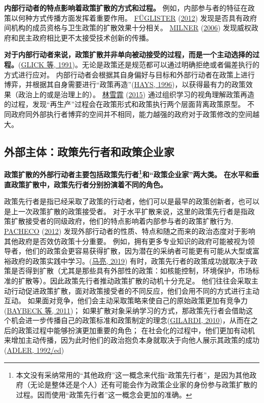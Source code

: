 \documentclass[
  12pt,
]{ctexart}
\begin{document}
\textbf{内部行动者的特点影响着政策扩散的方式和过程。}
例如，内部参与者的特征在政策以何种方式传播方面发挥着重要作用。
\protect\hyperlink{ref-Fuglister2012}{FÜGLISTER} (\protect\hyperlink{ref-Fuglister2012}{2012}) 发现是否具有政府间机构的成员资格与卫生政策的扩散效果十分相关。
\protect\hyperlink{ref-Milner2006}{MILNER} (\protect\hyperlink{ref-Milner2006}{2006}) 发现威权政府和民主政府相比更不太接受技术创新的传播。

\textbf{对于内部行动者来说，政策扩散并非单向被动接受的过程，而是一个主动选择的过程。}(\protect\hyperlink{ref-GlickHays1991}{GLICK 等, 1991})。无论是政策还是规范都可以通过明确拒绝或者偏差执行的方式进行应对。
内部行动者会根据其自身偏好与目标和外部行动者在政策上进行博弈，并根据其自身需要进行``政策再造''(\protect\hyperlink{ref-Hays1996}{HAYS, 1996})，以获得最有力的政策效果（政治上的或是治理上的）。
\protect\hyperlink{ref-LinXueFei2015}{林雪霏} (\protect\hyperlink{ref-LinXueFei2015}{2015}) 通过组织学习的视角理解政策再造的过程，发现``再生产''过程会在政策形式和政策执行两个层面背离政策原型。
不同政府同外部执行者博弈的空间并不相同，能力越强的政府对于政策修改的空间越大。

\hypertarget{ux5916ux90e8ux4e3bux4f53ux653fux7b56ux5148ux884cux8005ux548cux653fux7b56ux4f01ux4e1aux5bb6}{%
\subsection{外部主体：政策先行者和政策企业家}\label{ux5916ux90e8ux4e3bux4f53ux653fux7b56ux5148ux884cux8005ux548cux653fux7b56ux4f01ux4e1aux5bb6}}

\textbf{政策扩散的外部行动者主要包括政策先行者\footnote{本文没有采纳常用的``其他政府''这一概念来代指``政策先行者''，是因为其他政府（无论是整体还是个人）还有可能会作为政策企业家的身份参与政策扩散的过程。因而使用``政策先行者''这一概念会更加的准确。}和``政策企业家''两大类。}
\textbf{在水平和垂直政策扩散中，政策先行者分别扮演着不同的角色。}

政策先行者是指已经采取了政策的行动者，他们可以是最早的政策创新者，也可以是上一次政策扩散的政策接受者。
对于水平扩散来说，这里的政策先行者是指政策扩散接受者的同级政府，他们的特点影响着内部参与者的政策扩散行为,
\protect\hyperlink{ref-Pacheco2012a}{PACHECO} (\protect\hyperlink{ref-Pacheco2012a}{2012}) 发现外部行动者的性质、特点和随之而来的政治态度对于影响其他政府是否效仿政策十分重要。
例如，拥有更多专业知识的政府可能被视为领导者，他们的政策会更容易获得扩散，因为潜在的采纳者可能更有可能从大型或富裕政府的政策实践中学习。(\protect\hyperlink{ref-MaLiang2019}{马亮, 2019})
有时，政策先行者的政策成功就取决于政策是否得到扩散（尤其是那些具有外部性的政策：如核能控制，环境保护，市场标准的扩散等）。因此政策先行者推动政策扩散的动机十分充足。
他们往往会采取主动行动促进政策扩散，面对政策接受者的不同反应，他们会用不同的方式进行主动互动。
如果面对竞争，他们会主动采取策略来使自己的原始政策更加有竞争力(\protect\hyperlink{ref-BaybeckEtAl2011}{BAYBECK 等, 2011})；
如果扩散对象采纳学习的方式，那政策先行者会借助这个机会进一步传播自己的政策标准和政策制定的理念(\protect\hyperlink{ref-Gilardi2010b}{GILARDI, 2010})，从而在之后的政策过程中能够扮演更加重要的角色；
在社会化的过程中，他们更加有动机来增加主动传播，因为此时他们的政治抱负本身就取决于向他人展示其政策的成功(\protect\hyperlink{ref-Adler1992}{ADLER, 1992/ed})
\end{document}
